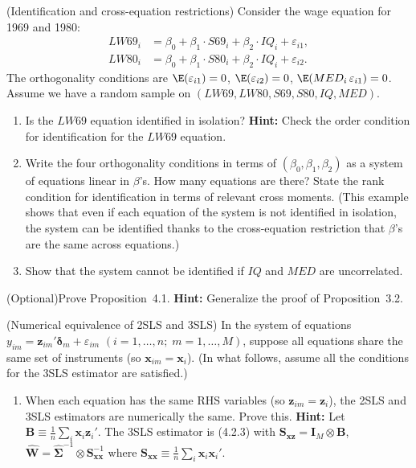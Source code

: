 \begin{problemset}
\exercise[5]
(Identification and cross-equation restrictions)\quad
Consider the wage equation for 1969 and 1980:
\begin{align*}
LW69_i &= \beta_0 + \beta_1 \cdot S69_i + \beta_2 \cdot IQ_i + \varepsilon_{i1}, \\
LW80_i &= \beta_0 + \beta_1 \cdot S80_i + \beta_2 \cdot IQ_i + \varepsilon_{i2}.
\end{align*}
The orthogonality conditions are $\E(\varepsilon_{i1}) = 0$,
$\E(\varepsilon_{i2}) = 0$,
$\E(MED_i\, \varepsilon_{i1}) = 0$.
Assume we have a random sample on $(LW69, LW80, S69, S80, IQ, MED)$.

\begin{enumerate}[label=(\alph*)]
\item Is the $LW69$ equation identified in isolation?
\textbf{Hint:} Check the order condition for identification for the $LW69$ equation.

\item Write the four orthogonality conditions in terms of
$(\beta_0, \beta_1, \beta_2)$ as a system of equations linear in $\beta$'s.
How many equations are there? State the rank condition for identification in terms
of relevant cross moments. (This example shows that even if each equation of the
system is not identified in isolation, the system can be identified thanks to the
cross-equation restriction that $\beta$'s are the same across equations.)

\item Show that the system cannot be identified if $IQ$ and $MED$ are uncorrelated.
\end{enumerate}

\exercise[6]
(Optional)\quad Prove Proposition~4.1. \textbf{Hint:} Generalize the proof of
Proposition~3.2.

\exercise[7]
(Numerical equivalence of 2SLS and 3SLS)\quad
In the system of equations
$y_{im} = \mathbf{z}_{im}' \boldsymbol{\delta}_m + \varepsilon_{im}$
$(i = 1, \ldots, n;\; m = 1, \ldots, M)$, suppose all equations share the
same set of instruments (so $\mathbf{x}_{im} = \mathbf{x}_i$). (In what follows,
assume all the conditions for the 3SLS estimator are satisfied.)

\begin{enumerate}[label=(\alph*)]
\item When each equation has the same RHS variables (so $\mathbf{z}_{im} = \mathbf{z}_i$),
the 2SLS and 3SLS estimators are numerically the same. Prove this.
\textbf{Hint:} Let $\mathbf{B} \equiv \frac{1}{n} \sum_i \mathbf{x}_i \mathbf{z}_i'$.
The 3SLS estimator is (4.2.3) with $\mathbf{S}_{\mathbf{xz}} = \mathbf{I}_M \otimes \mathbf{B}$,
$\hat{\mathbf{W}} = \widehat{\boldsymbol{\Sigma}}^{-1} \otimes \mathbf{S}_{\mathbf{xx}}^{-1}$
where $\mathbf{S}_{\mathbf{xx}} \equiv \frac{1}{n} \sum_i \mathbf{x}_i \mathbf{x}_i'$.


\end{enumerate}
\end{problemset}
